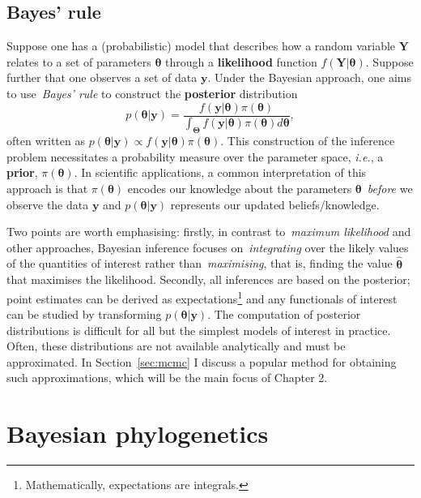 \subsection{Bayes' rule}

Suppose one has a (probabilistic) model that describes how a random variable $\boldsymbol Y$ relates to a set of parameters $\boldsymbol\theta$ through a \textbf{likelihood} function $f(\boldsymbol Y| \boldsymbol\theta)$.
Suppose further that one observes a set of data $\boldsymbol y$.
Under the Bayesian approach, one aims to use~\textit{Bayes' rule} to construct the \textbf{posterior} distribution
\[ p(\boldsymbol\theta | \boldsymbol y) = \frac{f(\boldsymbol y| \boldsymbol\theta) \pi(\boldsymbol\theta)}{\int_{\boldsymbol\Theta}f(\boldsymbol y| \boldsymbol\theta) \pi(\boldsymbol\theta)d\boldsymbol\theta } ,\]
often written as $p(\boldsymbol\theta | \boldsymbol y) \propto f(\boldsymbol y | \boldsymbol\theta)\pi(\boldsymbol\theta)$.
This construction of the inference problem necessitates a probability measure over the parameter space, \textit{i.e.}, a \textbf{prior}, $\pi(\boldsymbol\theta)$.
In scientific applications, a common interpretation of this approach is that $\pi(\boldsymbol\theta)$ encodes our knowledge about the parameters $\boldsymbol\theta$~\textit{before} we observe the data $\boldsymbol y$ and $p(\boldsymbol\theta | \boldsymbol y)$ represents our updated beliefs/knowledge.

Two points are worth emphasising: firstly, in contrast to~\textit{maximum likelihood} and other approaches, Bayesian inference focuses on~\textit{integrating} over the likely values of the quantities of interest rather than~\textit{maximising}, that is, finding the value $\hat{\boldsymbol\theta}$ that maximises the likelihood.
Secondly, all inferences are based on the posterior; point estimates can be derived as expectations\footnote{Mathematically, expectations are integrals.} and any functionals of interest can be studied by transforming $p(\boldsymbol\theta | \boldsymbol y)$. 
The computation of posterior distributions is difficult for all but the simplest models of interest in practice.
Often, these distributions are not available analytically and must be approximated.
In Section~\ref{sec:mcmc} I discuss a popular method for obtaining such approximations, which will be the main focus of Chapter 2.

\section{Bayesian phylogenetics}
\label{sec:bayesian_phylogenetics}

